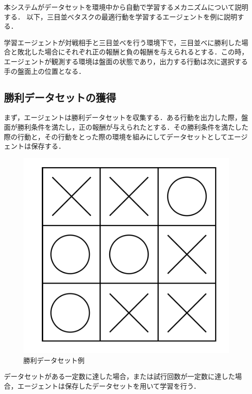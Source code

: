本システムがデータセットを環境中から自動で学習するメカニズムについて説明する．
以下，三目並べタスクの最適行動を学習するエージェントを例に説明する．

学習エージェントが対戦相手と三目並べを行う環境下で，三目並べに勝利した場合と敗北した場合にそれぞれ正の報酬と負の報酬を与えられるとする．この時，エージェントが観測する環境は盤面の状態であり，出力する行動は次に選択する手の盤面上の位置となる．

\subsection{勝利データセットの獲得}
まず，エージェントは勝利データセットを収集する．ある行動を出力した際，盤面が勝利条件を満たし，正の報酬が与えられたとする．その勝利条件を満たした際の行動と，その行動をとった際の環境を組みにしてデータセットとしてエージェントは保存する．

\begin{figure}[tb]
 \begin{center}
  \includegraphics[scale=0.4]{./koki/ds.png}
   \caption{勝利データセット例}
  \label{fig:ds}
 \end{center}
\end{figure}

データセットがある一定数に達した場合，または試行回数が一定数に達した場合，エージェントは保存したデータセットを用いて学習を行う．

